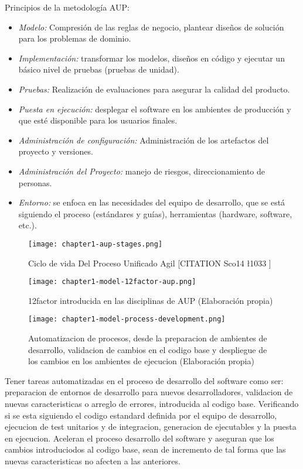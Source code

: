 \noindent Principios de la metodología AUP:
\begin{itemize}
  \item \textit{Modelo:} Compresión de las reglas de negocio, plantear diseños de solución para los problemas de dominio.
  \item \textit{Implementación:} transformar los modelos, diseños en código y ejecutar un básico nivel de pruebas (pruebas de unidad).
  \item \textit{Pruebas:} Realización de evaluaciones para asegurar la calidad del producto.
  \item \textit{Puesta en ejecución:} desplegar el software en los ambientes de producción y que esté disponible para los usuarios finales.
  \item \textit{Administración de configuración:} Administración de los artefactos del proyecto y versiones.
  \item \textit{Administración del Proyecto:} manejo de riesgos, direccionamiento de personas.
  \item \textit{Entorno:} se enfoca en las necesidades del equipo de desarrollo, que se está siguiendo el proceso (estándares y guías), herramientas (hardware, software, etc.).
\end{itemize}

\begin{figure}[ht]
  \centering
  \texttt{[image: chapter1-aup-stages.png]}
  \caption{Ciclo de vida Del Proceso Unificado Agil [CITATION Sco14 \l 1033 ]}  
\end{figure}

\begin{figure}[ht]
  \centering
  \texttt{[image: chapter1-model-12factor-aup.png]}
  \caption{12factor introducida en las disciplinas de AUP (Elaboración propia)}  
\end{figure}

\begin{figure}[ht]
  \centering
  \texttt{[image: chapter1-model-process-development.png]}
  \caption{Automatizacion de procesos, desde la preparacion de ambientes de desarrollo, validacion de cambios en el codigo base y despliegue de los cambios en los ambientes de ejecucion (Elaboración propia)}  
\end{figure}
\noindent Tener tareas automatizadas en el proceso de desarrollo del software como ser: preparacion de entornos de desarrollo para nuevos desarrolladores, validacion de nuevas caracteristicas o arreglo de errores, introducida al codigo base. Verificando si se esta siguiendo el codigo estandard definida por el equipo de desarrollo, ejecucion de test unitarios y de integracion, generacion de ejecutables y la puesta en ejecucion. Aceleran el proceso desarrollo del software y aseguran que los cambios introduciodos al codigo base, sean de incremento de tal forma que las nuevas caracteristicas no afecten a las anteriores.




